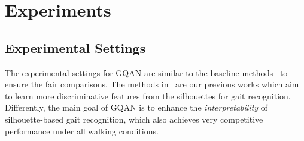 
\section{Experiments}

\subsection{Experimental Settings}
The experimental settings for GQAN are similar to the baseline methods~\cite{hou2020gait,hou2021setres,chao2019gaitset} to ensure the fair comparisons.
%
The methods in~\cite{hou2020gait,hou2021setres} are our previous works which aim to learn more discriminative features from the silhouettes for gait recognition.
%
Differently, the main goal of GQAN is to enhance the \emph{interpretability} of silhouette-based gait recognition, which also achieves very competitive performance under all walking conditions.

